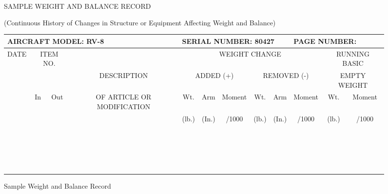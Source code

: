 \begin{figure}

\begin{center}
\begin{perfhdr}SAMPLE WEIGHT AND BALANCE RECORD 
  \end{perfhdr}
(Continuous History of Changes in Structure or Equipment Affecting Weight and Balance)\\
\vspace{.1in}

\settowidth{\colOne}{DATE}

\begin{tabular}{|c|c|c|c||c|c|c||c|c|c||c|c|}
\hline
\multicolumn{4}{|l||}{AIRCRAFT MODEL: RV-8}&\multicolumn{5}{l|}{SERIAL NUMBER: 80427}&\multicolumn{3}{l|}{PAGE NUMBER:}\\
\hline
\multirow{4}{\colOne}{\centering DATE}&\multicolumn{2}{c|}{ITEM NO.}&&
\multicolumn{6}{c||}{WEIGHT CHANGE}&\multicolumn{2}{c|}{RUNNING BASIC}\\
\cline{2-3}
\cline{5-10}
&&&DESCRIPTION&\multicolumn{3}{c||}{ADDED (+)}&\multicolumn{3}{c||}{REMOVED (-)}&\multicolumn{2}{c|}{EMPTY WEIGHT}\\
\cline{5-12}
&In&Out&OF ARTICLE OR MODIFICATION&Wt.&Arm&Moment&Wt.&Arm&Moment&Wt.&Moment\\
&&&&(lb.)&(In.)&/1000&(lb.)&(In.)&/1000&(lb.)&/1000\\
\hline
\hline
&&&&&&&&&&& \\
\hline
&&&&&&&&&&& \\
\hline
&&&&&&&&&&& \\
\hline
&&&&&&&&&&& \\
\hline
&&&&&&&&&&& \\
\hline
&&&&&&&&&&& \\
\hline
&&&&&&&&&&& \\
\hline
&&&&&&&&&&& \\
\hline
&&&&&&&&&&& \\
\hline
&&&&&&&&&&& \\
\hline
&&&&&&&&&&& \\
\hline
&&&&&&&&&&& \\
\hline
&&&&&&&&&&& \\
\hline
&&&&&&&&&&& \\
\hline
&&&&&&&&&&& \\
\hline
&&&&&&&&&&& \\
\hline
&&&&&&&&&&& \\
\hline
&&&&&&&&&&& \\
\hline
&&&&&&&&&&& \\
\hline
\end{tabular}
\caption{Sample Weight and Balance Record}
\label{Sample-WB-Record}
\end{center}
\end{figure}

